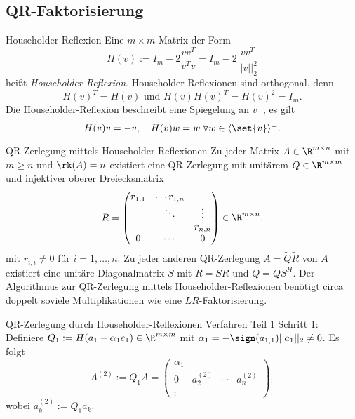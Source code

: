 \subsection*{QR-Faktorisierung}

\begin{karte}{Householder-Reflexion}
    Eine \( m\times m \)-Matrix der Form 
    \[ H(v) := I_m - 2 \frac{ v v^T }{ v^T v } = I_m - 2 \frac{v v^T}{||v||_2^2} \]
    heißt \textit{Householder-Reflexion}. Householder-Reflexionen sind orthogonal, 
    denn 
    \[ H(v)^T = H(v) \text{ und } H(v)H(v)^T = H(v)^2 = I_m. \]
    Die Householder-Reflexion beschreibt eine Spiegelung an \( v^\bot \), es gilt 
    \[ H(v)v = -v, \quad H(v)w = w \;\forall w\in \langle \set{v}\rangle^\bot. \]
\end{karte}

\begin{karte}{QR-Zerlegung mittels Householder-Reflexionen}
    Zu jeder Matrix \( A\in \R^{m\times n} \) mit \( m \geq n \) und 
    \( \rk(A) = n \) existiert eine QR-Zerlegung mit 
    unitärem \( Q \in \R^{m\times m} \) und injektiver oberer Dreiecksmatrix 
    \[ R = \begin{pmatrix}
        r_{1,1} & \cdots r_{1,n} \\
        & \ddots & \vdots \\
        &&r_{n,n} \\
        0 &\cdots &0
    \end{pmatrix} \in \R^{m\times n}, \]
    mit \( r_{i,i} \neq 0 \) für \( i = 1,\ldots, n \).
    Zu jeder anderen QR-Zerlegung \( A = \tilde{Q}\tilde{R} \) von \(A\) 
    existiert eine unitäre Diagonalmatrix \( S \) mit 
    \( R = S\tilde{R} \) und \( Q = \tilde{Q} S^H \).
    Der Algorithmus zur QR-Zerlegung mittels Householder-Reflexionen 
    benötigt circa doppelt soviele Multiplikationen wie eine \(LR\)-Faktorisierung.
\end{karte}

\begin{karte}{QR-Zerlegung durch Householder-Reflexionen Verfahren Teil 1}
    Schritt 1: Definiere \(Q_1 := H(a_1 - \alpha_1 e_1) \in \R^{m\times m} \) 
    mit \( \alpha_1 = - \sign(a_{1,1}) ||a_1||_2 \neq 0 \).
    Es folgt 
    \[ A^{(2)} := Q_1 A = \left(\begin{array}{c|c|c|c}
        \alpha_1 & & & \\
        0 & a_2^{(2)} & \cdots & a_n^{(2)} \\
        \vdots &&&
    \end{array} \right), \]
    wobei \( a_k^{(2)} := Q_1 a_k \).
\end{karte}

